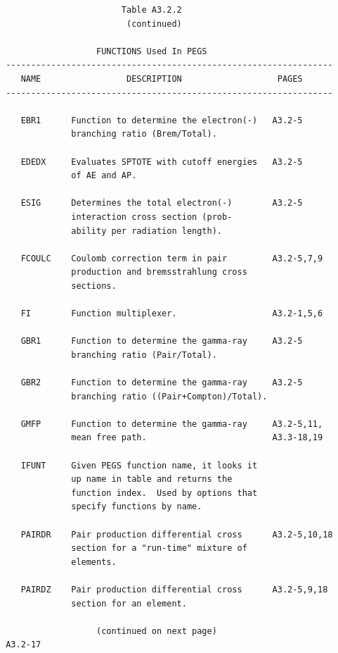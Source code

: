 \newpage {} \begin{verbatim}
                        Table A3.2.2
                         (continued)

                   FUNCTIONS Used In PEGS
 -----------------------------------------------------------------
    NAME                 DESCRIPTION                   PAGES
 -----------------------------------------------------------------

    EBR1      Function to determine the electron(-)   A3.2-5
              branching ratio (Brem/Total).

    EDEDX     Evaluates SPTOTE with cutoff energies   A3.2-5
              of AE and AP.

    ESIG      Determines the total electron(-)        A3.2-5
              interaction cross section (prob-
              ability per radiation length).

    FCOULC    Coulomb correction term in pair         A3.2-5,7,9
              production and bremsstrahlung cross
              sections.

    FI        Function multiplexer.                   A3.2-1,5,6

    GBR1      Function to determine the gamma-ray     A3.2-5
              branching ratio (Pair/Total).

    GBR2      Function to determine the gamma-ray     A3.2-5
              branching ratio ((Pair+Compton)/Total).

    GMFP      Function to determine the gamma-ray     A3.2-5,11,
              mean free path.                         A3.3-18,19

    IFUNT     Given PEGS function name, it looks it
              up name in table and returns the
              function index.  Used by options that
              specify functions by name.

    PAIRDR    Pair production differential cross      A3.2-5,10,18
              section for a "run-time" mixture of
              elements.

    PAIRDZ    Pair production differential cross      A3.2-5,9,18
              section for an element.

                   (continued on next page)
 A3.2-17
\end{verbatim}

